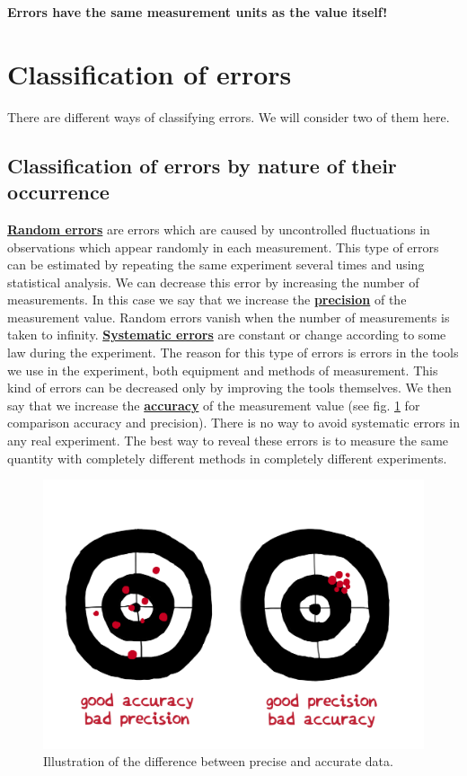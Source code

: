 \documentclass[12pt,a4paper]{article}
\newcommand{\definition}[1]{ \textcolor{MyRed}{\uline{\textbf {#1}}}}%
\begin{document}
\textbf{Errors have the same measurement units as the value itself!}

\section{Classification of errors}
There are different ways of classifying errors. We will consider two of them here.

\subsection{Classification of errors by nature of their occurrence}
\definition{Random errors} are errors which are caused by uncontrolled fluctuations in observations which appear randomly in each measurement. This type of errors can be estimated by repeating the same experiment several times and using statistical analysis. We can decrease this error by increasing the number of measurements. In this case we say that we increase the \definition{precision} of the measurement value. Random errors vanish when the number of measurements is taken to infinity.
\newline
\newline
\definition{Systematic errors} are constant or change according to some law during the experiment. The reason for this type of errors is errors in the tools we use in the experiment, both equipment and methods of measurement. This kind of errors can be decreased only by improving the tools themselves. We then say that we increase the \definition{accuracy} of the measurement value (see fig. \ref{fig:accuracy} for comparison accuracy and precision). There is no way to avoid systematic errors in any real experiment.  The best way to reveal these errors is to measure the same quantity with completely different methods in completely different experiments.

\begin{figure}
	\centering
	\vskip -2cm
	\includegraphics[width=0.7\linewidth]{accuracy.pdf}
	\vskip -0.5cm
	\caption{Illustration of the difference between precise and accurate data.}
	\label{fig:accuracy}
\end{figure}
\end{document}
